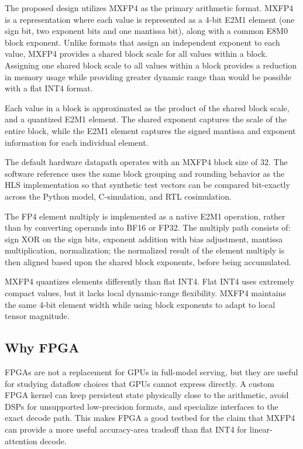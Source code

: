 \documentclass[conference]{IEEEtran}
\begin{document}
The proposed design utilizes MXFP4 as the primary arithmetic format. MXFP4 is a
representation where each value is represented as a 4-bit E2M1 element (one sign
bit, two exponent bits and one mantissa bit), along with a common E8M0 block
exponent. Unlike formats that assign an independent exponent to each value,
MXFP4 provides a shared block scale for all values within a block. Assigning one
shared block scale to all values within a block provides a reduction in memory
usage while providing greater dynamic range than would be possible with a flat
INT4 format.

Each value in a block is approximated as the product of the shared block scale,
and a quantized E2M1 element. The shared exponent captures the scale of the
entire block, while the E2M1 element captures the signed mantissa and exponent
information for each individual element.

The default hardware datapath operates with an MXFP4 block size of 32. The
software reference uses the same block grouping and rounding behavior as the HLS
implementation so that synthetic test vectors can be compared bit-exactly across
the Python model, C-simulation, and RTL cosimulation.

The FP4 element multiply is implemented as a native E2M1 operation, rather than
by converting operands into BF16 or FP32. The multiply path consists of: sign XOR
on the sign bits, exponent addition with bias adjustment, mantissa
multiplication, normalization; the normalized result of the element multiply is
then aligned based upon the shared block exponents, before being accumulated.

MXFP4 quantizes elements differently than flat INT4. Flat INT4 uses extremely
compact values, but it lacks local dynamic-range flexibility. MXFP4 maintains
the same 4-bit element width while using block exponents to adapt to local
tensor magnitude.

\subsection{Why FPGA}

FPGAs are not a replacement for GPUs in full-model serving, but they are useful
for studying dataflow choices that GPUs cannot express directly. A custom FPGA
kernel can keep persistent state physically close to the arithmetic, avoid DSPs
for unsupported low-precision formats, and specialize interfaces to the exact
decode path. This makes FPGA a good testbed for the claim that MXFP4 can provide
a more useful accuracy-area tradeoff than flat INT4 for linear-attention decode.
\end{document}
